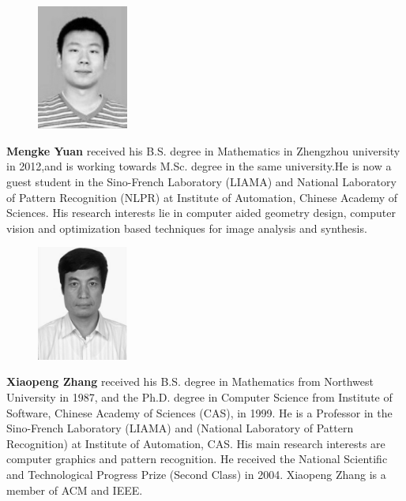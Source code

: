 \documentclass[preprint,10pt,5p,times,twocolumn]{elsarticle}
\begin{document}
\begin{figure}
\includegraphics [width=3cm,clip]{yuan.png}
\end{figure}
\textbf{Mengke Yuan} received his B.S. degree in Mathematics in Zhengzhou university in 2012,and
is working towards M.Sc. degree in the same university.He is now a guest student in the Sino-French
Laboratory (LIAMA) and National Laboratory of Pattern
Recognition (NLPR) at Institute of Automation, Chinese
Academy of Sciences. His research interests lie in
computer aided geometry design, computer vision and optimization based techniques for image analysis and synthesis.



\begin{figure}
\includegraphics [width=3cm,clip]{zhang.pdf}
\end{figure}
\textbf{Xiaopeng Zhang} received his B.S.
degree in Mathematics from Northwest University in 1987, and the Ph.D. degree in Computer Science from Institute of Software, Chinese Academy of Sciences (CAS), in 1999. He is a Professor in the Sino-French Laboratory (LIAMA) and (National Laboratory of Pattern Recognition) at Institute of Automation, CAS. His main research interests are computer graphics and pattern recognition. He received the National Scientific and Technological Progress Prize (Second Class) in 2004. Xiaopeng Zhang is a member of ACM and IEEE.







\end{document}
